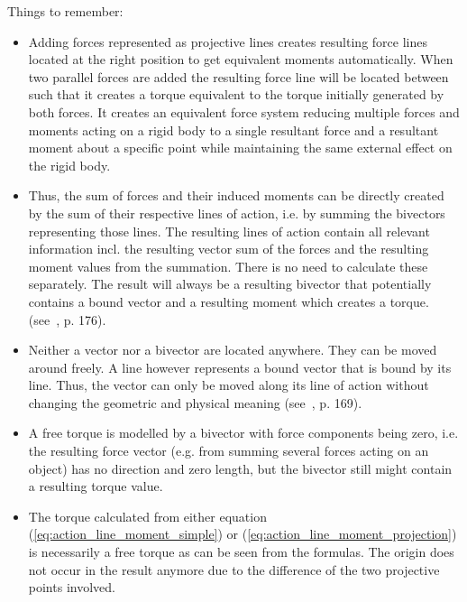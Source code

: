 Things to remember:
\begin{itemize}

    \item Adding forces represented as projective lines creates resulting force lines
    located at the right position to get equivalent moments automatically. When two
    parallel forces are added the resulting force line will be located between such that
    it creates a torque equivalent to the torque initially generated by both forces. It
    creates an equivalent force system reducing multiple forces and moments acting on a
    rigid body to a single resultant force and a resultant moment about a specific point
    while maintaining the same external effect on the rigid body.

    \item Thus, the sum of forces and their induced moments can be directly created by
    the sum of their respective lines of action, i.e. by summing the bivectors
    representing those lines. The resulting lines of action contain all relevant
    information incl. the resulting vector sum of the forces and the resulting moment
    values from the summation. There is no need to calculate these separately. The result
    will always be a resulting bivector that potentially contains a bound vector and a
    resulting moment which creates a torque.
    (see~\cite{Browne_Grassmann-Algebra_Vol1:2012}, p. 176).

    \item Neither a vector nor a bivector are located anywhere. They can be moved around
    freely. A line however represents a bound vector that is bound by its line. Thus, the
    vector can only be moved along its line of action without changing the geometric and
    physical meaning (see~\cite{Browne_Grassmann-Algebra_Vol1:2012}, p. 169).

    \item A free torque is modelled by a bivector with force components being zero, i.e.
    the resulting force vector (e.g. from summing several forces acting on an object) has
    no direction and zero length, but the bivector still might contain a resulting torque
    value.

    \item The torque calculated from either equation (\ref{eq:action_line_moment_simple})
    or (\ref{eq:action_line_moment_projection}) is necessarily a free torque as can be
    seen from the formulas. The origin does not occur in the result anymore due to the
    difference of the two projective points involved.

\end{itemize}

